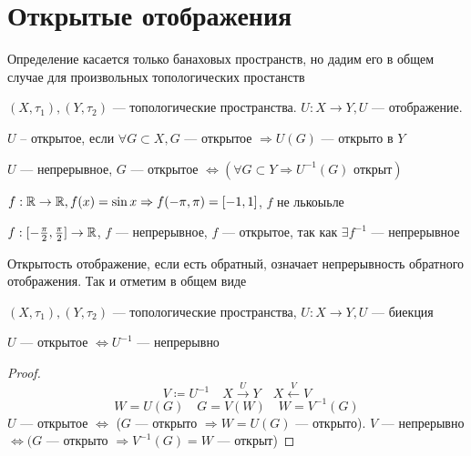 \documentclass[document]{subfiles}
\begin{document}
\section{Открытые отображения}

Определение касается только банаховых пространств, но дадим его в общем случае для произвольных топологических простанств

\begin{definition}
    $(X, \tau_1), (Y, \tau_2)$ --- топологические пространства. $U: X \rightarrow Y, U$ --- отображение.

    $U$ -- открытое, если $\forall G \subset X, G$ --- открытое $\Rightarrow U(G)$ --- открыто в $Y$
    
\end{definition}

\begin{remark}
    $U$ --- непрерывное, $G$ --- открытое $\Leftrightarrow (\forall G \subset Y \Rightarrow U^{-1}(G) \text{ открыт})$
\end{remark}

\begin{example}
    $f: \mathbb{R} \rightarrow \mathbb{R}, f(x) = \sin x \Rightarrow f(-\pi,\pi) = [-1,1]$, $f$ не лькоыьле
\end{example}

\begin{example}
    $f: [-\frac{\pi}{2}, \frac{\pi}{2}] \rightarrow \mathbb{R}$, $f$ --- непрерывное, $f$ --- открытое, так как $\exists f^{-1}$ --- непрерывное
\end{example}


Открытость отображение, если есть обратный, означает непрерывность обратного отображения. Так и отметим в общем виде 

\begin{statement}
    $(X, \tau_1), (Y, \tau_2)$ --- топологические пространства, $U: X \rightarrow Y, U$ --- биекция 

    $U$ --- открытое $\Leftrightarrow U^{-1}$ --- непрерывно
\end{statement}
\begin{proof}
    \[V \coloneqq U^{-1} \quad X \stackrel{U}{\longrightarrow} Y \quad X \stackrel{V}{\longleftarrow} V \]
    \[ W = U(G) \quad G = V(W) \quad W = V^{-1}(G) \] 
    $U$ --- открытое $\Leftrightarrow$ ($G$ --- открыто $\Rightarrow W = U(G)$ --- открыто).
    $V$ --- непрерывно $\Leftrightarrow (G$ --- открыто $\Rightarrow V^{-1}(G) = W$ --- открыт)
\end{proof}
\end{document}
